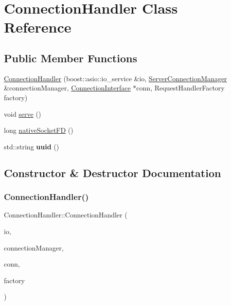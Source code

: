 \hypertarget{class_connection_handler}{}\section{Connection\+Handler Class Reference}
\label{class_connection_handler}
\subsection*{Public Member Functions}
\begin{DoxyCompactItemize}
\item 
\hyperlink{class_connection_handler_ad47277a5528017ca18c74c42184f506c}{Connection\+Handler} (boost\+::asio\+::io\+\_\+service \&io, \hyperlink{class_server_connection_manager}{Server\+Connection\+Manager} \&connection\+Manager, \hyperlink{class_connection_interface}{Connection\+Interface} $\ast$conn, Request\+Handler\+Factory factory)
\item 
void \hyperlink{class_connection_handler_a113fc7138a4dd5ab03fdca63091002a6}{serve} ()
\item 
long \hyperlink{class_connection_handler_a26a9c6287af17142e2497b26afd020df}{native\+Socket\+FD} ()
\item 
\mbox{\label{class_connection_handler_a0df2d9e8522cbb736bfa3113beb6a34d}} 
std\+::string {\bfseries uuid} ()
\end{DoxyCompactItemize}


\subsection{Constructor \& Destructor Documentation}
\mbox{\label{class_connection_handler_ad47277a5528017ca18c74c42184f506c}} 
\subsubsection{\texorpdfstring{Connection\+Handler()}{ConnectionHandler()}}
{\footnotesize\ttfamily Connection\+Handler\+::\+Connection\+Handler (\begin{DoxyParamCaption}\item[{boost\+::asio\+::io\+\_\+service \&}]{io,  }\item[{\hyperlink{class_server_connection_manager}{Server\+Connection\+Manager} \&}]{connection\+Manager,  }\item[{\hyperlink{class_connection_interface}{Connection\+Interface} $\ast$}]{conn,  }\item[{Request\+Handler\+Factory}]{factory }\end{DoxyParamCaption})}

